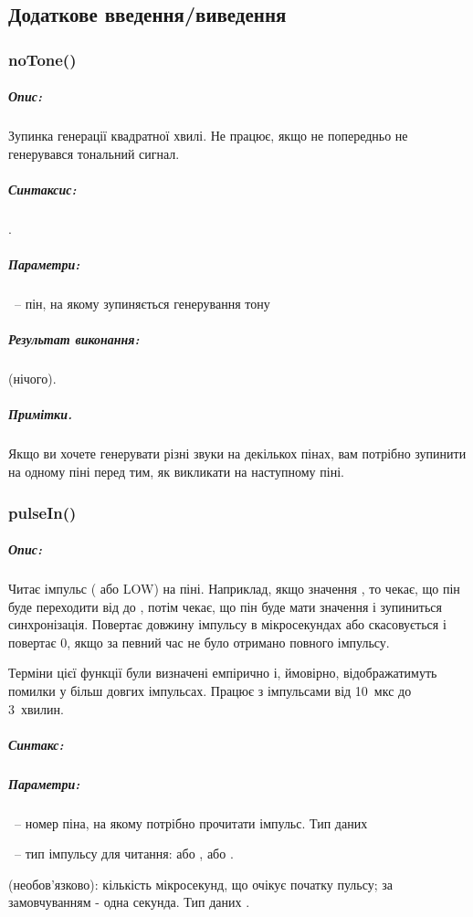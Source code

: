 \documentclass[12pt,a4paper]{report}  %
\begin{document}
\subsection{Додаткове введення/виведення}

\subsubsection{noTone()}\label{noTone}

\subparagraph{Опис:} Зупинка генерації квадратної хвилі. Не працює, якщо не попередньо не генерувався тональний сигнал.

\subparagraph{Синтаксис:} .
\subparagraph{Параметри:} ~-- пін, на якому зупиняється генерування тону
\subparagraph{Результат виконання:}  (нічого).
\subparagraph{Примітки.}
Якщо ви хочете генерувати різні звуки на декількох пінах, вам потрібно зупинити на одному піні перед тим, як викликати \hyperref[tone]{} на наступному піні.

\subsubsection{pulseIn()}\label{pulseIn}

\subparagraph{Опис:}
Читає імпульс ( або {LOW}) на піні. Наприклад, якщо значення , то  чекає, що пін буде переходити від  до , потім чекає, що пін буде мати значення  і зупиниться синхронізація. Повертає довжину імпульсу в мікросекундах або скасовується і повертає 0, якщо за певний час не було отримано повного імпульсу.

Терміни цієї функції були визначені емпірично і, ймовірно, відображатимуть помилки у більш довгих імпульсах. Працює з імпульсами від 10~мкс до 3~хвилин.

\subparagraph{Синтакс:}



\subparagraph{Параметри:}

~-- номер піна, на якому потрібно прочитати імпульс. Тип даних 

~-- тип імпульсу для читання: або , або .

 (необов'язково): кількість мікросекунд, що очікує початку пульсу; за замовчуванням - одна секунда. Тип даних .
\end{document}
